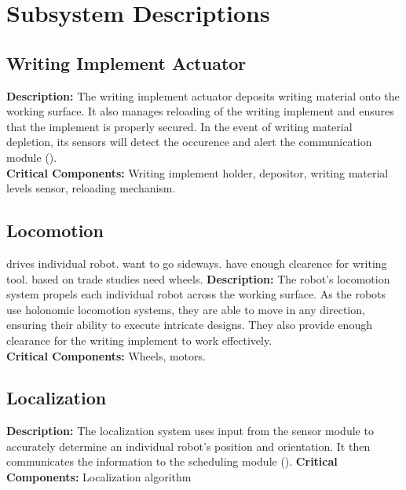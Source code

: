 
\section{Subsystem Descriptions}
\label{sec:subsystem_descriptions}




\subsection{Writing Implement Actuator}
\label{sec:subsystem_writing_implement_actuator}
\textbf{Description:} The writing implement actuator deposits writing material onto the working surface. It also manages reloading of the writing implement and ensures that the implement is properly secured. In the event of writing material depletion, its sensors will detect the occurence and alert the communication module ().\\
\textbf{Critical Components:} Writing implement holder, depositor, writing material levels sensor, reloading mechanism.\\

\subsection{Locomotion}
\label{sec:subsystem_locomotion}
drives individual robot. want to go sideways. have enough clearence for writing tool. based on trade studies need wheels.
\textbf{Description:} The robot's locomotion system propels each individual robot across the working surface. As the robots use holonomic locomotion systems, they are able to move in any direction, ensuring their ability to execute intricate designs. They also provide enough clearance for the writing implement to work effectively.\\
\textbf{Critical Components:} Wheels, motors.\\


\subsection{Localization}
\label{sec:subsystem_localization}
\textbf{Description:} The localization system uses input from the sensor module to accurately determine an individual robot's position and orientation. It then communicates the information to the scheduling module (). 
\textbf{Critical Components:} Localization algorithm

